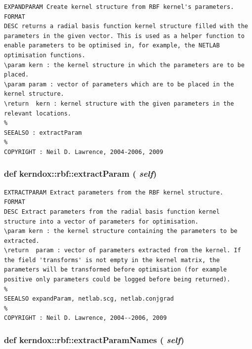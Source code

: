 \footnotesize\begin{verbatim}EXPANDPARAM Create kernel structure from RBF kernel's parameters.
FORMAT
DESC returns a radial basis function kernel structure filled with the
parameters in the given vector. This is used as a helper function to
enable parameters to be optimised in, for example, the NETLAB
optimisation functions.
\param kern : the kernel structure in which the parameters are to be
placed.
\param param : vector of parameters which are to be placed in the
kernel structure.
\return  kern : kernel structure with the given parameters in the
relevant locations.
%
SEEALSO : extractParam
%
COPYRIGHT : Neil D. Lawrence, 2004-2006, 2009

\end{verbatim}
\normalsize
 \hypertarget{classkerndox_1_1rbf_a81e44bc54a3442798c96bda3b3fd197}{
\subsubsection[{extractParam}]{\setlength{\rightskip}{0pt plus 5cm}def kerndox::rbf::extractParam ( {\em self})}}
\label{classkerndox_1_1rbf_a81e44bc54a3442798c96bda3b3fd197}




\footnotesize\begin{verbatim}EXTRACTPARAM Extract parameters from the RBF kernel structure.
FORMAT
DESC Extract parameters from the radial basis function kernel
structure into a vector of parameters for optimisation.
\param kern : the kernel structure containing the parameters to be
extracted.
\return  param : vector of parameters extracted from the kernel. If
the field 'transforms' is not empty in the kernel matrix, the
parameters will be transformed before optimisation (for example
positive only parameters could be logged before being returned).
%
SEEALSO expandParam, netlab.scg, netlab.conjgrad
%
COPYRIGHT : Neil D. Lawrence, 2004--2006, 2009

\end{verbatim}
\normalsize
 \hypertarget{classkerndox_1_1rbf_9e5c81421d3c9e23bd3d5341c15c08db}{
\subsubsection[{extractParamNames}]{\setlength{\rightskip}{0pt plus 5cm}def kerndox::rbf::extractParamNames ( {\em self})}}
\label{classkerndox_1_1rbf_9e5c81421d3c9e23bd3d5341c15c08db}




